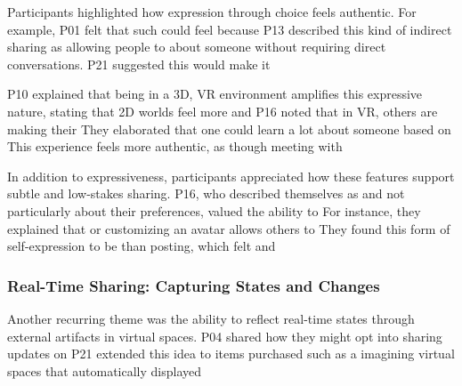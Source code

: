 Participants highlighted how expression through choice feels authentic. For example, P01 felt that such  could feel  because  P13 described this kind of indirect sharing as  allowing people to  about someone without requiring direct conversations. P21 suggested this would make it 

P10 explained that being in a 3D, VR environment amplifies this expressive nature, stating that 2D worlds feel more  and  P16 noted that in VR, others are  making their  They elaborated that one could learn a lot about someone based on  This experience feels more authentic, as though meeting with 

In addition to expressiveness, participants appreciated how these features support subtle and low-stakes sharing. P16, who described themselves as  and not particularly  about their preferences, valued the ability to  For instance, they explained that  or customizing an avatar allows others to  They found this form of self-expression to be  than posting, which felt  and 

\subsubsection{Real-Time Sharing: Capturing States and Changes}
\label{lab:4-3-2}
Another recurring theme was the ability to reflect real-time states through external artifacts in virtual spaces. P04 shared how they might opt into sharing updates on  P21 extended this idea to items purchased such as a  imagining virtual spaces that automatically displayed 

